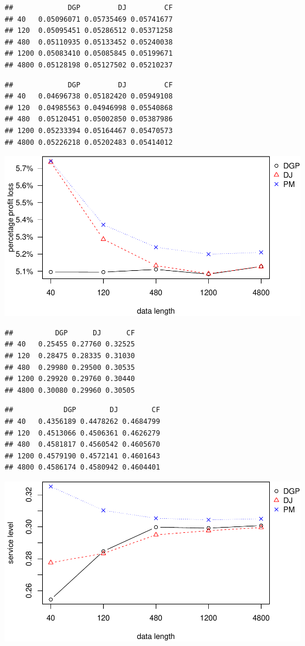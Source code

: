 \documentclass[
]{article}
\begin{document}
\begin{verbatim}
##             DGP         DJ         CF
## 40   0.05096071 0.05735469 0.05741677
## 120  0.05095451 0.05286512 0.05371258
## 480  0.05110935 0.05133452 0.05240038
## 1200 0.05083410 0.05085845 0.05199671
## 4800 0.05128198 0.05127502 0.05210237
\end{verbatim}

\begin{verbatim}
##             DGP         DJ         CF
## 40   0.04696738 0.05182420 0.05949108
## 120  0.04985563 0.04946998 0.05540868
## 480  0.05120451 0.05002850 0.05387986
## 1200 0.05233394 0.05164467 0.05470573
## 4800 0.05226218 0.05202483 0.05414012
\end{verbatim}

\includegraphics{information-plot_files/figure-latex/SAR(3)(1)_4ppl-1.pdf}

\begin{verbatim}
##          DGP      DJ      CF
## 40   0.25455 0.27760 0.32525
## 120  0.28475 0.28335 0.31030
## 480  0.29980 0.29500 0.30535
## 1200 0.29920 0.29760 0.30440
## 4800 0.30080 0.29960 0.30505
\end{verbatim}

\begin{verbatim}
##            DGP        DJ        CF
## 40   0.4356189 0.4478262 0.4684799
## 120  0.4513066 0.4506361 0.4626279
## 480  0.4581817 0.4560542 0.4605670
## 1200 0.4579190 0.4572141 0.4601643
## 4800 0.4586174 0.4580942 0.4604401
\end{verbatim}

\includegraphics{information-plot_files/figure-latex/SAR(3)(1)_4sl-1.pdf}
\end{document}

